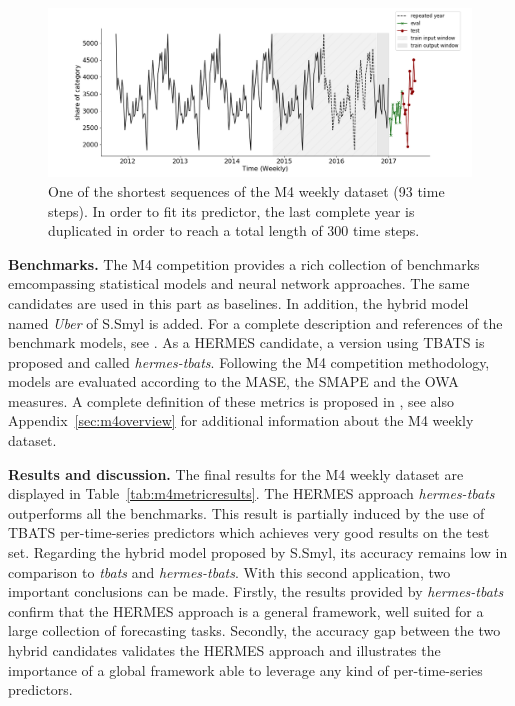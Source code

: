 \documentclass[review]{elsarticle}
\begin{document}
\begin{figure}
  \centering
    \includegraphics[width=1.\linewidth]{figure/M4_dataset}
  \caption{One of the shortest sequences of the M4 weekly dataset (93 time steps). In order to fit its predictor, the last complete year is duplicated in order to reach a total length of 300 time steps.}
\label{fig:m4dataset}
\end{figure}

\textbf{Benchmarks. } The M4 competition provides a rich collection of benchmarks emcompassing statistical models and neural network approaches. The same candidates are used in this part as baselines. In addition, the hybrid model named \textit{Uber} of S.Smyl is added. For a complete description and references of the benchmark models, see \cite{makridakis2020m4}. As a HERMES candidate, a version using TBATS is proposed and called \textit{hermes-tbats}. Following the M4 competition methodology, models are evaluated according to the MASE, the SMAPE and the OWA measures. A complete definition of these metrics is proposed in \cite{makridakis2020m4}, see also Appendix~\ref{sec:m4overview} for additional information about the M4 weekly dataset.

\textbf{Results and discussion. } The final results for the M4 weekly dataset are displayed in Table~\ref{tab:m4metricresults}. The HERMES approach \textit{hermes-tbats} outperforms all the benchmarks. This result is partially induced by the use of TBATS per-time-series predictors which achieves very good results on the test set. Regarding the hybrid model proposed by S.Smyl, its accuracy remains low in comparison to \textit{tbats} and  \textit{hermes-tbats}. With this second application, two important conclusions can be made. Firstly, the results provided by \textit{hermes-tbats} confirm that the HERMES approach is a general framework, well suited for a large collection of forecasting tasks. Secondly, the accuracy gap between the two hybrid candidates validates the HERMES approach and illustrates the importance of a global framework able to leverage any kind of per-time-series predictors.
\end{document}
